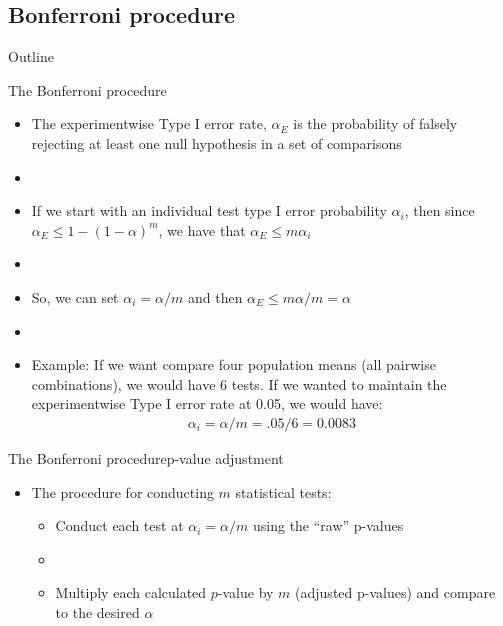 \documentclass[xcolor=dvipsnames]{beamer}
\begin{document}
\subsection{Bonferroni procedure}

\begin{frame}{Outline}
	\tableofcontents[currentsection,subsectionstyle=show/shaded/hide]
\end{frame}

\begin{frame}{The Bonferroni procedure}
	\begin{itemize}
		\item The experimentwise Type I error rate, $\alpha_E$ is the probability of falsely rejecting at least one null hypothesis in a set of comparisons \pause
		\item[]
		\item If we start with an individual test type I error probability $\alpha_i$, then since $\alpha_E\leq 1-(1-\alpha)^m$, we have that $\alpha_E\leq m \alpha_i$ \pause
		\item[]
		\item So, we can set $\alpha_i = \alpha / m$ and then $\alpha_E \leq m \alpha / m = \alpha$ \pause
		\item[]
		\item Example: If we want compare four population means (all pairwise combinations), we would have 6 tests. If we wanted to maintain the experimentwise Type I error rate at 0.05, we would have: \pause
		\begin{gather*}
			\alpha_i = \alpha / m = .05 / 6 = 0.0083
		\end{gather*}
	\end{itemize}
\end{frame}

\begin{frame}{The Bonferroni procedure}{p-value adjustment }
	\begin{itemize}
		\item The procedure for conducting $m$ statistical tests: \pause
		\begin{itemize}
			\item Conduct each test at $\alpha_i = \alpha / m$ using the ``raw'' p-values \pause
			\item[]
			\item Multiply each calculated $p$-value by $m$ (adjusted p-values) and compare to the desired $\alpha$
		\end{itemize}
	\end{itemize}
\end{frame}
\end{document}
